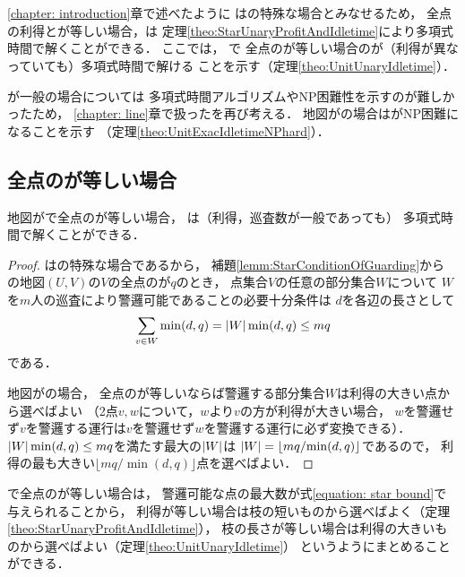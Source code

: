 \chapter{{\graphUnit}}
\label{chapter: unit}

\ref{chapter: introduction}章で述べたように
{\graphUnit}は{\graphStar}の特殊な場合とみなせるため，
全点の利得と{\maxIdletime}が等しい場合，{\patProb}は
定理\ref{theo:StarUnaryProfitAndIdletime}により多項式時間で解くことができる．
ここでは，
{\graphUnit}で
全点の{\maxIdletime}が等しい場合の{\patProb}が（利得が異なっていても）多項式時間で解ける
ことを示す（定理\ref{theo:UnitUnaryIdletime}）．

{\maxIdletime}が一般の場合については
多項式時間アルゴリズムやNP困難性を示すのが難しかったため，
\ref{chapter: line}章で扱った{\timeSpecifiedPatProb}を再び考える．
地図が{\graphUnit}の場合は{\timeSpecifiedPatProb}がNP困難になることを示す
（定理\ref{theo:UnitExacIdletimeNPhard}）．



\section{全点の{\maxIdletime}が等しい場合}

\begin{theo}
  \label{theo:UnitUnaryIdletime}
  地図が{\graphUnit}で全点の{\maxIdletime}が等しい場合，
  {\patProb}は（利得，巡査数が一般であっても）
  多項式時間で解くことができる．
\end{theo}

\begin{proof}
  {\graphUnit}は{\graphStar}の特殊な場合であるから，
  補題\ref{lemm:StarConditionOfGuarding}から
  {\graphUnit}の地図$(U, V)$の$V$の全点の{\maxIdletime}が$q$のとき，
  点集合$V$の任意の部分集合$W$について
  $W$を$m$人の巡査により警邏可能であることの必要十分条件は
  $d$を各辺の長さとして
  \[
    \sum_{v \in W} \min(d, q) = \lvert{W}\rvert\min(d, q) \leq mq
  \]
  である．

  地図が{\graphUnit}の場合，
  全点の{\maxIdletime}が等しいならば警邏する部分集合$W$は利得の大きい点から選べばよい
  （2点$v, w$について，$w$より$v$の方が利得が大きい場合，
  $w$を警邏せず$v$を警邏する運行は$v$を警邏せず$w$を警邏する運行に必ず変換できる）．
  $\lvert{W}\rvert\min(d, q) \leq mq$を満たす最大の$\lvert{W}\rvert$は
  $\lvert{W}\rvert = \left\lfloor {mq}/{\min(d, q)} \right\rfloor$であるので，
  利得の最も大きい$\lfloor {mq}/{\min(d, q)} \rfloor$点を選べばよい．
\end{proof}

{\graphStar}で全点の{\maxIdletime}が等しい場合は，
警邏可能な点の最大数が式\eqref{equation: star bound}で与えられることから，
利得が等しい場合は枝の短いものから選べばよく（定理\ref{theo:StarUnaryProfitAndIdletime}），
枝の長さが等しい場合は利得の大きいものから選べばよい（定理\ref{theo:UnitUnaryIdletime}）
というようにまとめることができる．



